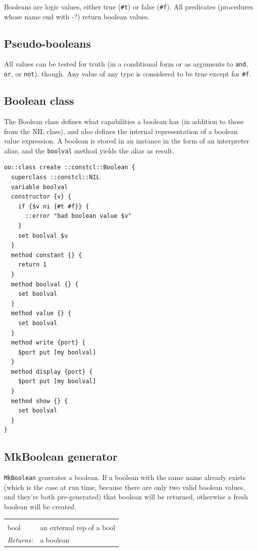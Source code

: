 \documentclass[twoside]{report}
\begin{document}
Booleans are logic values, either true (\texttt{\#t}) or false (\texttt{\#f}). All predicates (procedures whose name end with -?) return boolean values.

\subsection{Pseudo-booleans}
\label{pseudobooleans}

All values can be tested for truth (in a conditional form or as arguments to \texttt{and}, \texttt{or}, or \texttt{not}), though. Any value of any type is considered to be true except for \texttt{\#f}.

\subsection{Boolean class}
\label{boolean-class}

The Boolean class defines what capabilities a boolean has (in addition to those from the NIL class), and also defines the internal representation of a boolean value expression. A boolean is stored in an instance in the form of an interpreter alias, and the \texttt{boolval} method yields the alias as result.

\begin{lstlisting}
oo::class create ::constcl::Boolean {
  superclass ::constcl::NIL
  variable boolval
  constructor {v} {
    if {$v ni {#t #f}} {
      ::error "bad boolean value $v"
    }
    set boolval $v
  }
  method constant {} {
    return 1
  }
  method boolval {} {
    set boolval
  }
  method value {} {
    set boolval
  }
  method write {port} {
    $port put [my boolval]
  }
  method display {port} {
    $port put [my boolval]
  }
  method show {} {
    set boolval
  }
}
\end{lstlisting}

\subsection{MkBoolean generator}
\label{mkboolean-generator}

\texttt{MkBoolean} generates a boolean. If a boolean with the same name already exists (which is the case at run time, because there are only two valid boolean values, and they're both pre-generated) that boolean will be returned, otherwise a fresh boolean will be created.

\noindent\begin{tabular}{ |p{1.9cm} p{8cm}| }
\hline
\rowcolor[HTML]{CCCCCC} \multicolumn{2}{|l|}{\bf MkBoolean (internal)} \\
bool & an external rep of a bool \\
\textit{Returns:} & a boolean \\
\hline
\end{tabular}
\end{document}
